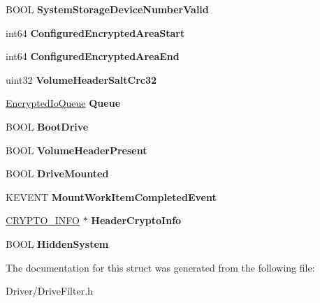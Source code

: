 \begin{DoxyCompactItemize}
\item 
\mbox{\label{struct___drive_filter_extension_a0052ea0e220ec33bda3f0eb33924dc3b}} 
B\+O\+OL {\bfseries System\+Storage\+Device\+Number\+Valid}
\item 
\mbox{\label{struct___drive_filter_extension_a5a5257547974878627f3f68877365bae}} 
int64 {\bfseries Configured\+Encrypted\+Area\+Start}
\item 
\mbox{\label{struct___drive_filter_extension_aea2088c537c5f074cb164d15eddc3519}} 
int64 {\bfseries Configured\+Encrypted\+Area\+End}
\item 
\mbox{\label{struct___drive_filter_extension_aca0d06c99087251601f1381f22c9e5b3}} 
uint32 {\bfseries Volume\+Header\+Salt\+Crc32}
\item 
\mbox{\label{struct___drive_filter_extension_a4c9cefce3a2a79c8307ed1fb079e394d}} 
\hyperlink{struct_encrypted_io_queue}{Encrypted\+Io\+Queue} {\bfseries Queue}
\item 
\mbox{\label{struct___drive_filter_extension_a08c0541710df6bcf0624598ace8b9665}} 
B\+O\+OL {\bfseries Boot\+Drive}
\item 
\mbox{\label{struct___drive_filter_extension_a2784a3bd8391b4053fbfd5af1a8ab476}} 
B\+O\+OL {\bfseries Volume\+Header\+Present}
\item 
\mbox{\label{struct___drive_filter_extension_af256f904a5ff46dc16e8b5429bc4b6f9}} 
B\+O\+OL {\bfseries Drive\+Mounted}
\item 
\mbox{\label{struct___drive_filter_extension_a3407bb938d1e9f4600c9c9377c683b32}} 
K\+E\+V\+E\+NT {\bfseries Mount\+Work\+Item\+Completed\+Event}
\item 
\mbox{\label{struct___drive_filter_extension_a29e020cba0c4673f824e058899f1449c}} 
\hyperlink{struct_c_r_y_p_t_o___i_n_f_o__t}{C\+R\+Y\+P\+T\+O\+\_\+\+I\+N\+FO} $\ast$ {\bfseries Header\+Crypto\+Info}
\item 
\mbox{\label{struct___drive_filter_extension_a68c83800676215e747ba0811ea801cc2}} 
B\+O\+OL {\bfseries Hidden\+System}
\end{DoxyCompactItemize}


The documentation for this struct was generated from the following file\+:\begin{DoxyCompactItemize}
\item 
Driver/Drive\+Filter.\+h\end{DoxyCompactItemize}
